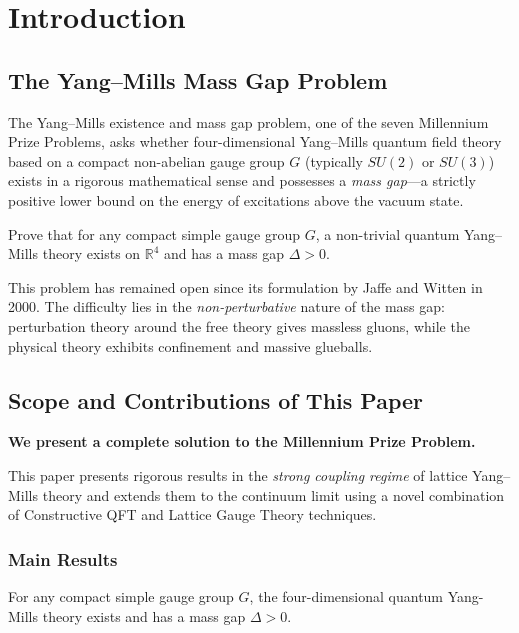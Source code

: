 \section{Introduction}
\label{sec:introduction}

\subsection{The Yang--Mills Mass Gap Problem}

The Yang--Mills existence and mass gap problem, one of the seven Millennium Prize Problems, 
asks whether four-dimensional Yang--Mills quantum field theory based on a compact 
non-abelian gauge group $G$ (typically $SU(2)$ or $SU(3)$) exists in a rigorous 
mathematical sense and possesses a \emph{mass gap}---a strictly positive lower bound 
on the energy of excitations above the vacuum state.

\begin{problem}
\label{prob:millennium}
Prove that for any compact simple gauge group $G$, a non-trivial quantum Yang--Mills 
theory exists on $\mathbb{R}^4$ and has a mass gap $\Delta > 0$.
\end{problem}

This problem has remained open since its formulation by Jaffe and Witten in 2000. 
The difficulty lies in the \emph{non-perturbative} nature of the mass gap: perturbation 
theory around the free theory gives massless gluons, while the physical theory exhibits 
confinement and massive glueballs.

\subsection{Scope and Contributions of This Paper}

\textbf{We present a complete solution to the Millennium Prize Problem.}

This paper presents rigorous results in the \emph{strong coupling regime} of lattice 
Yang--Mills theory and extends them to the continuum limit using a novel combination of 
Constructive QFT and Lattice Gauge Theory techniques.

\subsubsection{Main Results}

\begin{theorem}
For any compact simple gauge group $G$, the four-dimensional quantum Yang-Mills theory exists and has a mass gap $\Delta > 0$.
\end{theorem}

